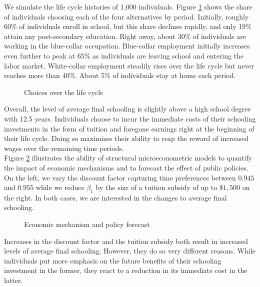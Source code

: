\noindent We simulate the life cycle histories of 1,000 individuals. Figure \ref{Choices over the life cycle} shows the share of individuals choosing each of the four alternatives by period. Initially, roughly 60\% of individuals enroll in school, but this share declines rapidly, and only 19\% attain any post-secondary education. Right away, about 30\% of individuals are working in the blue-collar occupation.  Blue-collar employment initially increases even further to peak at 65\% as individuals are leaving school and entering the labor market. White-collar employment steadily rises over the life cycle but never reaches more than 40\%. About 5\% of individuals stay at home each period.

\begin{figure}[ht!]\centering
\caption{Choices over the life cycle}\label{Choices over the life cycle}
\end{figure}\FloatBarrier

\noindent Overall, the level of average final schooling is slightly above a high school degree with 12.5 years. Individuals choose to incur the immediate costs of their schooling investments in the form of tuition and foregone earnings right at the beginning of their life cycle. Doing so maximizes their ability to reap the reward of increased wages over the remaining time periods.\\

\noindent Figure \ref{Economic mechanism and policy forecast} illustrates the ability of structural microeconometric models to quantify the impact of economic mechanisms and to forecast the effect of public policies. On the left, we vary the discount factor capturing time preferences between $0.945$ and $0.955$ while we reduce $\beta_1$ by the size of a tuition subsidy of up to $\$1,500$ on the right. In both cases, we are interested in the changes to average final schooling.

\begin{figure}[h!]\centering
\caption{Economic mechanism and policy forecast}\label{Economic mechanism and policy forecast}
\hspace{0.3cm}
\end{figure}\FloatBarrier

\noindent Increases in the discount factor and the tuition subsidy both result in increased levels of average final schooling. However, they do so very different reasons. While individuals put more emphasis on the future benefits of their schooling investment in the former, they react to a reduction in its immediate cost in the latter.
